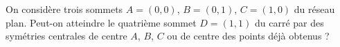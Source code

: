 On considère trois sommets $A = (0, 0)$, $B = (0, 1)$, $C = (1, 0)$ du réseau plan. Peut-on atteindre le quatrième sommet $D = (1, 1)$ du carré par des symétries centrales de centre $A$, $B$, $C$ ou de centre des points déjà obtenus ?
